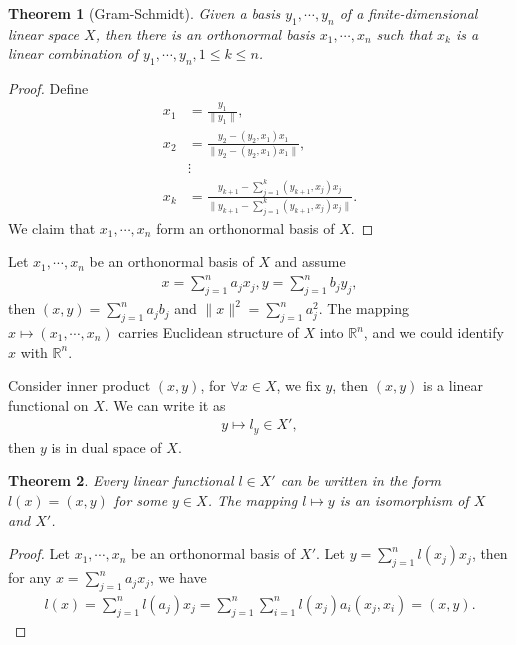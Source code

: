\documentclass[10pt]{book}
\newtheorem{theorem}{Theorem}[chapter]
\theoremstyle{definition}
\numberwithin{equation}{chapter}
\begin{document}
\begin{theorem}[Gram-Schmidt]
Given a basis $y_1,\cdots,y_n$ of a finite-dimensional linear space $X$, then there is an orthonormal basis $x_1,\cdots,x_n$ such that $x_k$ is a linear combination of $y_1,\cdots,y_n, 1\leq k \leq n$.
\end{theorem}
\begin{proof}
Define
\begin{align*}
    x_1 & = \frac{y_1}{\|y_1\|}, \\
    x_2 & = \frac{y_2 - (y_2,x_1)x_1}{\|y_2 - (y_2,x_1)x_1\|}, \\
    & \vdots \\
    x_k & = \frac{y_{k+1} - \sum^k_{j=1}(y_{k+1},x_j)x_j}{\|y_{k+1} - \sum^k_{j=1}(y_{k+1},x_j)x_j\|}.
\end{align*}
We claim that $x_1,\cdots,x_n$ form an orthonormal basis of $X$.
\end{proof}

\medskip

Let $x_1,\cdots,x_n$ be an orthonormal basis of $X$ and assume 
\begin{align*}
    x = \sum^n_{j=1} a_j x_j, y = \sum^n_{j=1} b_j y_j,
\end{align*}
then $(x,y) = \sum^n_{j=1} a_jb_j$ and $\|x\|^2 = \sum^n_{j=1} a_j^2$.  The mapping $x\mapsto (x_1,\cdots,x_n)$ carries Euclidean structure of $X$ into $\mathbb{R}^n$, and we could identify $x$ with $\mathbb{R}^n$.

Consider inner product $(x,y)$, for $\forall x\in X$, we fix $y$, then $(x,y)$ is a linear functional on $X$. We can write it as 
\begin{align*}
    y \mapsto l_y \in X',
\end{align*}
then $y$ is in dual space of $X$.

\medskip

\begin{theorem}
Every linear functional $l\in X'$ can be written in the form $l(x) = (x,y)$ for some $y\in X$. The mapping $l \mapsto y$ is an isomorphism of $X$ and $X'$.
\end{theorem}
\begin{proof}
Let $x_1,\cdots,x_n$ be an orthonormal basis of $X'$. Let $y = \sum^n_{j=1}l(x_j)x_j$, then for any $x = \sum^n_{j=1}a_jx_j$, we have
\begin{align*}
    l(x) = \sum^n_{j=1}l(a_j) x_j = \sum^n_{j=1}\sum^n_{i=1} l(x_j) a_i (x_j, x_i) = (x,y).
\end{align*}
\end{proof}
\end{document}
